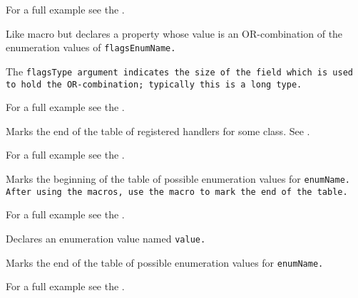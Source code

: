 For a full example see the .


\label{wxpropertyflags}


Like  macro but declares a property whose value
is an OR-combination of the enumeration values of \tt{flagsEnumName}.

The \tt{flagsType} argument indicates the size of the field which is used to hold
the OR-combination; typically this is a \tt{long} type.

For a full example see the .


\label{wxendpropertiestable}


Marks the end of the table of registered handlers for some class.
See .

For a full example see the .


\label{wxbeginenum}


Marks the beginning of the table of possible enumeration values for \tt{enumName}.
After using the  macros, use the
 macro to mark the end of the table.

For a full example see the .


\label{wxenummember}


Declares an enumeration value named \tt{value}.


\label{wxendenum}


Marks the end of the table of possible enumeration values for \tt{enumName}.

For a full example see the .


\label{wxbeginflags}

